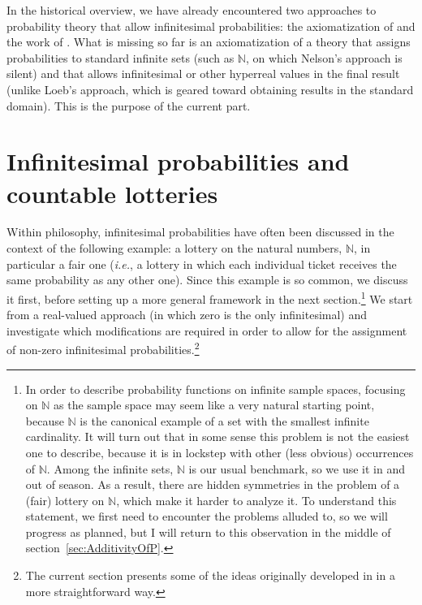 
\noindent In the historical overview, we have already encountered two approaches to probability theory that allow infinitesimal probabilities: the axiomatization of \citet{Nelson:1987} and the work of \citet{Loeb:1975}. What is missing so far is an axiomatization of a theory that assigns probabilities to standard infinite sets (such as $\mathbb{N}$, on which Nelson's approach is silent) and that allows infinitesimal or other hyperreal values in the final result (unlike Loeb's approach, which is geared toward obtaining results in the standard domain). This is the purpose of the current part.

\section{Infinitesimal probabilities and countable lotteries}\label{sec:natural}
Within philosophy, infinitesimal probabilities have often been discussed in the context of the following example: a lottery on the natural numbers, $\mathbb{N}$, in particular a fair one (\textit{i.e.}, a lottery in which each individual ticket receives the same probability as any other one). Since this example is so common, we discuss it first, before setting up a more general framework in the next section.\footnote{In order to describe probability functions on infinite sample spaces, focusing on $\mathbb{N}$ as the sample space may seem like a very natural starting point, because $\mathbb{N}$ is the canonical example of a set with the smallest infinite cardinality.
It will turn out that in some sense this problem is not the easiest one to describe, because it is in lockstep with other (less obvious) occurrences of $\mathbb{N}$. Among the infinite sets, $\mathbb{N}$ is our usual benchmark, so we use it in and out of season. As a result, there are hidden symmetries in the problem of a (fair) lottery on $\mathbb{N}$, which make it harder to analyze it. To understand this statement, we first need to encounter the problems alluded to, so we will progress as planned, but I will return to this observation in the middle of section~\ref{sec:AdditivityOfP}.}
We start from a real-valued approach (in which zero is the only infinitesimal) and investigate which modifications are required in order to allow for the assignment of non-zero infinitesimal probabilities.\footnote{The current section presents some of the ideas originally developed in \citet{WenmackersHorsten:2013} in a more straightforward way.}


